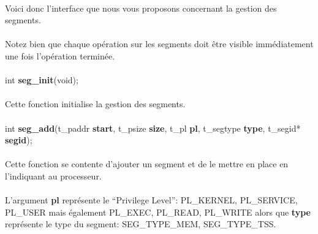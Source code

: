 \documentclass[10pt,a4wide]{article}
\begin{document}
\paragraph{}

Voici donc l'interface que nous vous proposons concernant la
gestion des segments.

\paragraph{}

Notez bien que chaque op\'eration sur les segments doit \^etre
visible imm\'ediatement une fois l'op\'eration termin\'ee.

\paragraph{}

\hspace{1.5cm}int \textbf{seg\_init}(void);

\paragraph{}

Cette fonction initialise la gestion des segments.

\paragraph{}

\hspace{1.5cm}int \textbf{seg\_add}(t\_paddr \textbf{start},
                                    t\_psize \textbf{size},
                                    t\_pl \textbf{pl},
                                    t\_segtype \textbf{type},
                                    t\_segid* \textbf{segid});

\paragraph{}

Cette fonction se contente d'ajouter un segment et de le mettre en
place en l'indiquant au processeur.

\paragraph{}

L'argument \textbf{pl} repr\'esente le ``Privilege Level'': PL\_KERNEL,
PL\_SERVICE, PL\_USER mais \'egalement PL\_EXEC, PL\_READ, PL\_WRITE
alors que \textbf{type} repr\'esente le type du segment: SEG\_TYPE\_MEM,
SEG\_TYPE\_TSS.
\end{document}
